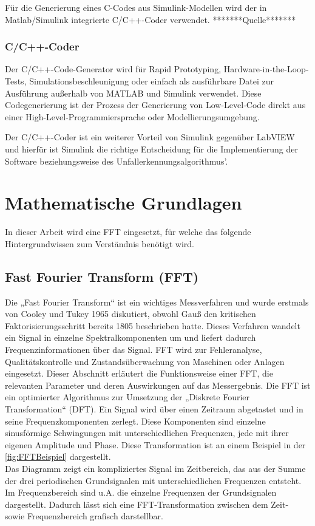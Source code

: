 Für die Generierung eines C-Codes aus Simulink-Modellen wird der in Matlab/Simulink integrierte C/C++-Coder verwendet. *******Quelle******* %

\subsubsection{C/C++-Coder}
Der C/C++-Code-Generator wird für Rapid Prototyping, Hardware-in-the-Loop-Tests, Simulationsbeschleunigung oder einfach als ausführbare Datei zur Ausführung außerhalb von MATLAB und Simulink verwendet.
Diese Codegenerierung ist der Prozess der Generierung von Low-Level-Code direkt aus einer High-Level-Programmiersprache oder Modellierungsumgebung.

Der C/C++-Coder ist ein weiterer Vorteil von Simulink gegenüber LabVIEW und hierfür ist Simulink die richtige Entscheidung für die Implementierung der Software beziehungsweise des Unfallerkennungsalgorithmus'.






\section{Mathematische Grundlagen}

In dieser Arbeit wird eine FFT eingesetzt, für welche das folgende Hintergrundwissen zum Verständnis benötigt wird.
\subsection{Fast Fourier Transform (FFT)} \label{abs:FFT}

Die „Fast Fourier Transform“ ist ein wichtiges Messverfahren und wurde erstmals von Cooley und Tukey 1965 diskutiert, obwohl Gauß den kritischen Faktorisierungsschritt bereits 1805 beschrieben hatte. Dieses Verfahren wandelt ein Signal in einzelne Spektralkomponenten um und liefert dadurch Frequenzinformationen über das Signal. FFT wird zur Fehleranalyse, Qualitätskontrolle und Zustandsüberwachung von Maschinen oder Anlagen eingesetzt. Dieser Abschnitt erläutert die Funktionsweise einer FFT, die relevanten Parameter und deren Auswirkungen auf das Messergebnis.
Die FFT ist ein optimierter Algorithmus zur Umsetzung der „Diskrete Fourier Transformation“ (DFT). Ein Signal wird über einen Zeitraum abgetastet und in seine Frequenzkomponenten zerlegt. Diese Komponenten sind einzelne sinusförmige Schwingungen mit unterschiedlichen Frequenzen, jede mit ihrer eigenen Amplitude und Phase. Diese Transformation ist an einem Beispiel in der \autoref{fig:FFTBeispiel} dargestellt.\\
Das Diagramm zeigt ein kompliziertes Signal im Zeitbereich, das aus der Summe der drei periodischen Grundsignalen mit unterschiedlichen Frequenzen entsteht. Im Frequenzbereich sind u.A. die einzelne Frequenzen der Grundsignalen dargestellt. Dadurch lässt sich eine FFT-Transformation zwischen dem Zeit- sowie Frequenzbereich grafisch darstellbar.

